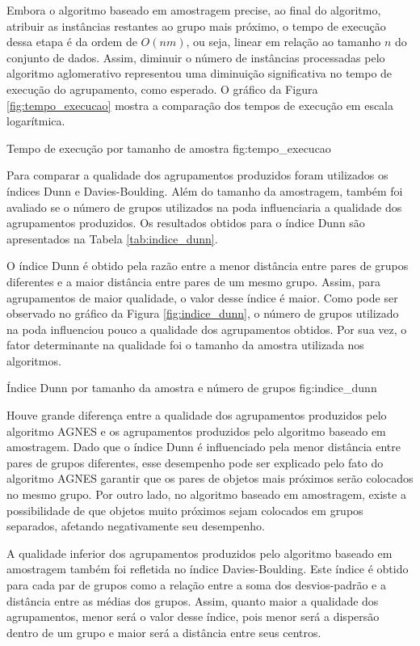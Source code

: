

Embora o algoritmo baseado em amostragem precise, ao final do algoritmo,
atribuir as instâncias restantes ao grupo mais próximo, o tempo de execução 
dessa etapa é da ordem de $O\left(nm\right)$, ou seja, linear em relação ao 
tamanho $n$ do conjunto de dados. Assim, diminuir o número de instâncias
processadas pelo algoritmo aglomerativo representou uma diminuição significativa
no tempo de execução do agrupamento, como esperado. O gráfico da Figura 
\ref{fig:tempo_execucao} mostra a comparação dos tempos de execução em escala
logarítmica.

{Tempo de execução por tamanho de amostra}
{fig:tempo_execucao}

Para comparar a qualidade dos agrupamentos produzidos foram utilizados os
índices Dunn e Davies-Boulding. Além do tamanho da amostragem, também foi
avaliado se o número de grupos utilizados na poda influenciaria a qualidade dos
agrupamentos produzidos. Os resultados obtidos para o índice Dunn são apresentados
na Tabela \ref{tab:indice_dunn}.



O índice Dunn é obtido pela razão entre a menor distância entre pares de grupos
diferentes e a maior distância entre pares de um mesmo grupo. Assim, para
agrupamentos de maior qualidade, o valor desse índice é maior. Como pode ser 
observado no gráfico da Figura \ref{fig:indice_dunn}, o número de grupos
utilizado na poda influenciou pouco a qualidade dos agrupamentos obtidos. Por
sua vez, o fator determinante na qualidade foi o tamanho da amostra utilizada
nos algoritmos.

{Índice Dunn por tamanho da amostra e número de grupos}
{fig:indice_dunn}

Houve grande diferença entre a qualidade dos agrupamentos produzidos pelo
algoritmo AGNES e os agrupamentos produzidos pelo algoritmo baseado em
amostragem. Dado que o índice Dunn é influenciado pela menor distância entre
pares de grupos diferentes, esse desempenho pode ser explicado pelo fato do 
algoritmo AGNES garantir que os pares de objetos mais próximos serão colocados 
no mesmo grupo. Por outro lado, no algoritmo baseado em amostragem, existe a
possibilidade de que objetos muito próximos sejam colocados em grupos separados,
afetando negativamente seu desempenho.

A qualidade inferior dos agrupamentos produzidos pelo algoritmo baseado em 
amostragem também foi refletida no índice Davies-Boulding. Este índice é obtido
para cada par de grupos como a relação entre a soma dos desvios-padrão e a 
distância entre as médias dos grupos. Assim, quanto maior a qualidade dos 
agrupamentos, menor será o valor desse índice, pois menor será a dispersão
dentro de um grupo e maior será a distância entre seus centros. 

